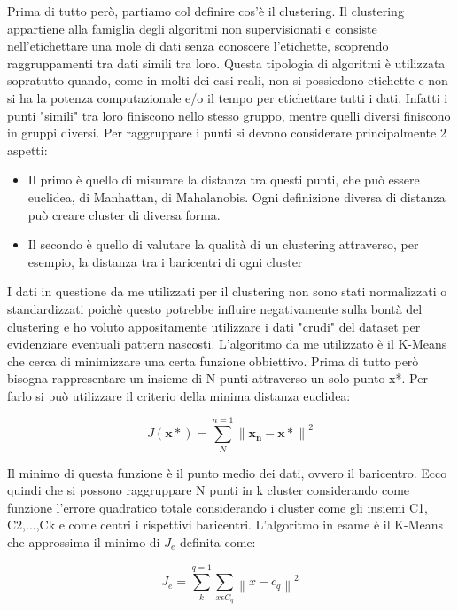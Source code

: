 Prima di tutto però, partiamo col definire cos'è il clustering. Il clustering appartiene alla famiglia degli algoritmi non supervisionati e consiste nell'etichettare una mole di dati senza conoscere l'etichette, scoprendo raggruppamenti tra dati simili tra loro. Questa tipologia di algoritmi è utilizzata sopratutto quando, come in molti dei casi reali, non si possiedono etichette e non si ha la potenza computazionale e/o il tempo per etichettare tutti i dati. Infatti i punti "simili" tra loro finiscono nello stesso gruppo, mentre quelli diversi finiscono in gruppi diversi. Per raggruppare i punti si devono considerare principalmente 2 aspetti:
\begin{itemize}
    \item Il primo è quello di misurare la distanza tra questi punti, che può essere euclidea, di Manhattan, di Mahalanobis. Ogni definizione diversa di distanza può creare cluster di diversa forma.
    \item Il secondo è quello di valutare la qualità di un clustering attraverso, per esempio, la distanza tra i baricentri di ogni cluster
\end{itemize}
I dati in questione da me utilizzati per il clustering non sono stati normalizzati o standardizzati poichè questo potrebbe influire negativamente sulla bontà del clustering e ho voluto appositamente utilizzare i dati "crudi" del dataset per evidenziare eventuali pattern nascosti. 
L'algoritmo da me utilizzato è il K-Means che cerca di minimizzare una certa funzione obbiettivo.
Prima di tutto però bisogna rappresentare un insieme di N punti attraverso un solo punto x*. Per farlo si può utilizzare il criterio della minima distanza euclidea:

\begin{equation}
    J(\mathbf{x*})=\sum_{N}^{n=1}\left \| \mathbf{x_{n}-x*}  \right \|^{2}
\end{equation}

Il minimo di questa funzione è il punto medio dei dati, ovvero il baricentro. Ecco quindi che si possono raggruppare N punti in k cluster considerando come funzione l'errore quadratico totale considerando i cluster come gli insiemi C1, C2,...,Ck e come centri i rispettivi baricentri. 
L'algoritmo in esame è il K-Means che approssima il minimo di \begin{math}J_e\end{math} definita come:

\begin{equation}
    J_{e}=\sum_{k}^{q=1}\sum_{x\epsilon C_{q}}^{}\left \| x-c_{q} \right \|^{2}
\end{equation}

